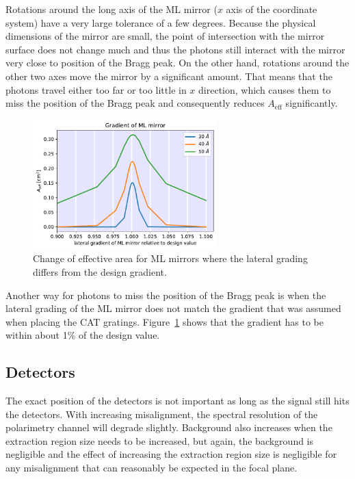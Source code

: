 \documentclass[]{spie}  %
\begin{document}
Rotations around the long axis of the ML mirror ($x$ axis of the
coordinate system) have a very large tolerance of a few
degrees. Because the physical dimensions of the mirror are small, the
point of intersection with the mirror surface does not change much and
thus the photons still interact with the mirror very close to position
of the Bragg peak. On the other hand, rotations around the other two
axes move the mirror by a significant amount. That means that the
photons travel either too far or too little in $x$
direction, which causes them to miss the position of the Bragg peak
and consequently reduces $A_{\mathrm{eff}}$ significantly.

\begin{figure} [ht]
  \begin{center}
    \includegraphics[height=5cm]{LGML_gradient.pdf}
  \end{center}
  \caption
      { \label{fig:LGML_gradient}Change of effective area for ML mirrors where the lateral grading differs from the design gradient.
}
\end{figure}

Another way for photons to miss the position of the Bragg peak is when
the lateral grading of the ML mirror does not match the gradient that
was assumed when placing the CAT
gratings. Figure~\ref{fig:LGML_gradient} shows that the gradient has
to be within about 1\% of the design value.

\subsection{Detectors}
The exact position of the detectors is not important as long as the
signal still hits the detectors. With increasing misalignment, the
spectral resolution of the polarimetry channel will degrade
slightly.
Background also increases
when the extraction region size needs to be increased, but again,
the background is negligible and the
effect of increasing the extraction region
size is negligible for any misalignment that can reasonably be
expected in the focal plane.
\end{document}
